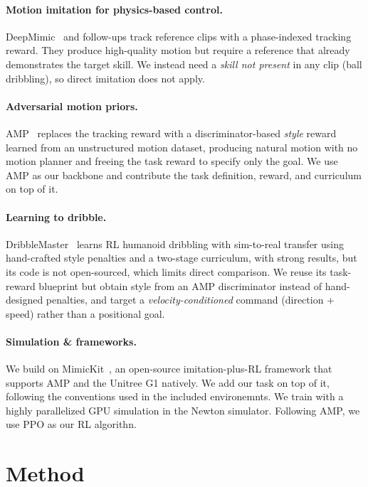 \documentclass[10pt,twocolumn,letterpaper]{article}
\begin{document}
\paragraph{Motion imitation for physics-based control.}
DeepMimic~\cite{2018-TOG-deepMimic} and follow-ups track reference clips with a
phase-indexed tracking reward. They produce high-quality motion but require a
reference that already demonstrates the target skill. We instead need a
\emph{skill not present} in any clip (ball dribbling), so direct imitation does
not apply.

\paragraph{Adversarial motion priors.}
AMP~\cite{peng2021amp} replaces the tracking reward with a discriminator-based
\emph{style} reward learned from an unstructured motion dataset, producing
natural motion with no motion planner and freeing the task reward to specify
only the goal. We use AMP as our backbone and contribute the task definition,
reward, and curriculum on top of it.

\paragraph{Learning to dribble.}
DribbleMaster~\cite{wang2025dribble} learns RL humanoid dribbling with sim-to-real
transfer using hand-crafted style penalties and a two-stage curriculum, with
strong results, but its code is not open-sourced, which limits direct
comparison. We reuse its task-reward blueprint but obtain style from an AMP
discriminator instead of hand-designed penalties, and target a
\emph{velocity-conditioned} command (direction + speed) rather than a positional
goal.

\paragraph{Simulation \& frameworks.}
We build on MimicKit~\cite{MimicKitPeng2025}, an open-source imitation-plus-RL
framework that supports AMP and the Unitree G1 natively. We
add our task on top of it, following the conventions used in the included environemnts. 
We train with a highly parallelized GPU simulation in the Newton simulator. Following AMP,
we use PPO as our RL algorithn.


\section{Method}
\label{sec:method}
\end{document}
